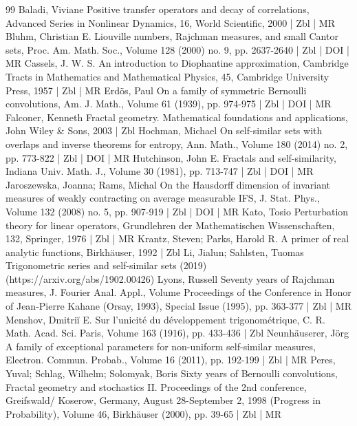 \documentclass[10pt]{amsart}
\theoremstyle{definition}\newtheorem{defi}[theo]{Definition}\newtheorem{rema}[theo]{Remark}\newtheorem{exam}[theo]{Example}\newtheorem{exem}[theo]{Example}\newtheorem{nota}[theo]{Notation}
\begin{document}
\begin{thebibliography}{99}
Baladi, Viviane Positive transfer operators and decay of correlations, Advanced Series in Nonlinear Dynamics, 16, World Scientific, 2000 | Zbl | MR
Bluhm, Christian E. Liouville numbers, Rajchman measures, and small Cantor sets, Proc. Am. Math. Soc., Volume 128 (2000) no. 9, pp. 2637-2640 | Zbl | DOI | MR
Cassels, J. W. S. An introduction to Diophantine approximation, Cambridge Tracts in Mathematics and Mathematical Physics, 45, Cambridge University Press, 1957 | Zbl | MR
Erdös, Paul On a family of symmetric Bernoulli convolutions, Am. J. Math., Volume 61 (1939), pp. 974-975 | Zbl | DOI | MR
Falconer, Kenneth Fractal geometry. Mathematical foundations and applications, John Wiley \& Sons, 2003 | Zbl
Hochman, Michael On self-similar sets with overlaps and inverse theorems for entropy, Ann. Math., Volume 180 (2014) no. 2, pp. 773-822 | Zbl | DOI | MR
Hutchinson, John E. Fractals and self-similarity, Indiana Univ. Math. J., Volume 30 (1981), pp. 713-747 | Zbl | DOI | MR
Jaroszewska, Joanna; Rams, Michal On the Hausdorff dimension of invariant measures of weakly contracting on average measurable IFS, J. Stat. Phys., Volume 132 (2008) no. 5, pp. 907-919 | Zbl | DOI | MR
Kato, Tosio Perturbation theory for linear operators, Grundlehren der Mathematischen Wissenschaften, 132, Springer, 1976 | Zbl | MR
Krantz, Steven; Parks, Harold R. A primer of real analytic functions, Birkhäuser, 1992 | Zbl
Li, Jialun; Sahlsten, Tuomas Trigonometric series and self-similar sets (2019) (https://arxiv.org/abs/1902.00426)
Lyons, Russell Seventy years of Rajchman measures, J. Fourier Anal. Appl., Volume Proceedings of the Conference in Honor of Jean-Pierre Kahane (Orsay, 1993), Special Issue (1995), pp. 363-377 | Zbl | MR
Menshov, Dmitriĭ E. Sur l’unicité du développement trigonométrique, C. R. Math. Acad. Sci. Paris, Volume 163 (1916), pp. 433-436 | Zbl
Neunhäuserer, Jörg A family of exceptional parameters for non-uniform self-similar measures, Electron. Commun. Probab., Volume 16 (2011), pp. 192-199 | Zbl | MR
Peres, Yuval; Schlag, Wilhelm; Solomyak, Boris Sixty years of Bernoulli convolutions, Fractal geometry and stochastics II. Proceedings of the 2nd conference, Greifswald/ Koserow, Germany, August 28-September 2, 1998 (Progress in Probability), Volume 46, Birkhäuser (2000), pp. 39-65 | Zbl | MR

\end{thebibliography}
\end{document}
